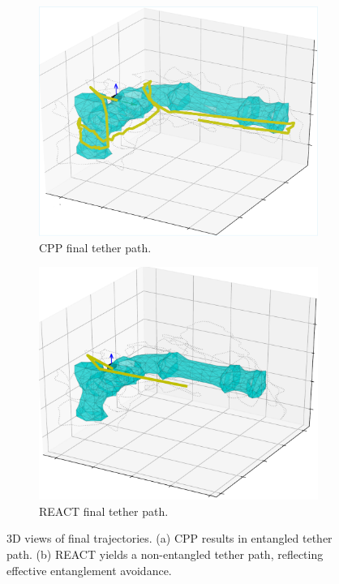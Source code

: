 \begin{figure}[ht]
    \centering
    \begin{subfigure}[b]{0.48\linewidth}
        \centering
        \includegraphics[width=\linewidth]{EA-Planner/figures/fc_planner_final_view.pdf}
        \caption{\ac{CPP} final tether path.}
        \label{fig:3d_cpp}
    \end{subfigure}
    \hfill
    \begin{subfigure}[b]{0.48\linewidth}
        \centering
        \includegraphics[width=\linewidth]{EA-Planner/figures/react_pipe.pdf}
        \caption{\ac{REACT} final tether path.}
        \label{fig:3d_oea}
    \end{subfigure}
    \caption{3D views of final trajectories. (a) CPP results in entangled tether path. (b) \ac{REACT} yields a non-entangled tether path, reflecting effective entanglement avoidance.}
    \label{fig:3Dplots}
\end{figure}

